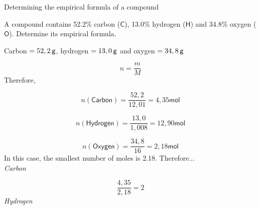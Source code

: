     \noindent
\label{m38712*secfhsst!!!underscore!!!id1029}\vspace{.5cm} 
      \noindent 
      \begin{wex}{Determining the empirical formula of a compound }{
      \label{m38712*probfhsst!!!underscore!!!id1030}
      \label{m38712*id280897}A compound contains 52.2\% carbon ($\mathsf{C}$), 13.0\% hydrogen ($\mathsf{H}$) and 34.8\% oxygen ($\mathsf{O}$). Determine its empirical formula.\par 
      \vspace{5pt}
}
{ %
      \label{m38712*id280928}Carbon $=52,2\phantom{\rule{2pt}{0ex}}\mathsf{g}$, hydrogen $=13,0\phantom{\rule{2pt}{0ex}}\mathsf{g}$ and oxygen $=34,8\phantom{\rule{2pt}{0ex}}\mathsf{g}$\par 
      \label{m38712*id280954}\nopagebreak\noindent{}
        
    \begin{equation}
    n=\frac{m}{M}
      \end{equation}
      \label{m38712*id280975}Therefore,\par 
      \label{m38712*id280978}\nopagebreak\noindent{}
        
    \begin{equation}
    n\left(\mathsf{Carbon}\right)=\frac{52,2}{12,01}=4,35\mathsf{mol}
      \end{equation}
      \label{m38712*id281042}\nopagebreak\noindent{}
        
    \begin{equation}
    n\left(\mathsf{Hydrogen}\right)=\frac{13,0}{1,008}=12,90\mathsf{mol}
      \end{equation}
      \label{m38712*id281111}\nopagebreak\noindent{}
        
    \begin{equation}
    n\left(\mathsf{Oxygen}\right)=\frac{34,8}{16}=2,18\mathsf{mol}
      \end{equation}
In this case, the smallest number of moles is 2.18. Therefore... \\ 
      \label{m38712*id281179}
        \textsl{Carbon}
      \par 
      \label{m38712*id281185}\nopagebreak\noindent{}
        
    \begin{equation}
    \frac{4,35}{2,18}=2
      \end{equation}
      \label{m38712*id281217}
        \textsl{Hydrogen}
      \par 
      \label{m38712*id281223}\nopagebreak\noindent{}
        
}
\end{wex}
